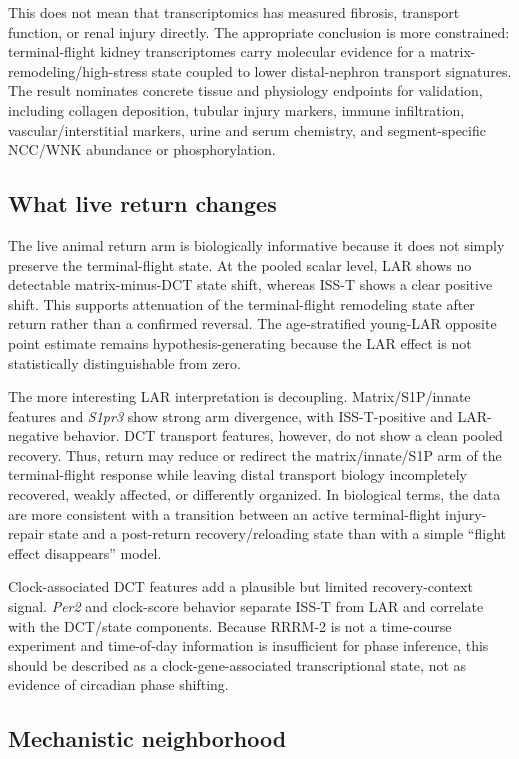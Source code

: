 \documentclass[11pt]{article}
\newcommand{\gene}[1]{\textit{#1}}
\begin{document}
This does not mean that transcriptomics has measured fibrosis, transport function, or renal injury directly. The appropriate conclusion is more constrained: terminal-flight kidney transcriptomes carry molecular evidence for a matrix-remodeling/high-stress state coupled to lower distal-nephron transport signatures. The result nominates concrete tissue and physiology endpoints for validation, including collagen deposition, tubular injury markers, immune infiltration, vascular/interstitial markers, urine and serum chemistry, and segment-specific NCC/WNK abundance or phosphorylation.

\subsection{What live return changes}

The live animal return arm is biologically informative because it does not simply preserve the terminal-flight state. At the pooled scalar level, LAR shows no detectable matrix-minus-DCT state shift, whereas ISS-T shows a clear positive shift. This supports attenuation of the terminal-flight remodeling state after return rather than a confirmed reversal. The age-stratified young-LAR opposite point estimate remains hypothesis-generating because the LAR effect is not statistically distinguishable from zero.

The more interesting LAR interpretation is decoupling. Matrix/S1P/innate features and \gene{S1pr3} show strong arm divergence, with ISS-T-positive and LAR-negative behavior. DCT transport features, however, do not show a clean pooled recovery. Thus, return may reduce or redirect the matrix/innate/S1P arm of the terminal-flight response while leaving distal transport biology incompletely recovered, weakly affected, or differently organized. In biological terms, the data are more consistent with a transition between an active terminal-flight injury-repair state and a post-return recovery/reloading state than with a simple ``flight effect disappears'' model.

Clock-associated DCT features add a plausible but limited recovery-context signal. \gene{Per2} and clock-score behavior separate ISS-T from LAR and correlate with the DCT/state components. Because RRRM-2 is not a time-course experiment and time-of-day information is insufficient for phase inference, this should be described as a clock-gene-associated transcriptional state, not as evidence of circadian phase shifting.

\subsection{Mechanistic neighborhood}
\end{document}
